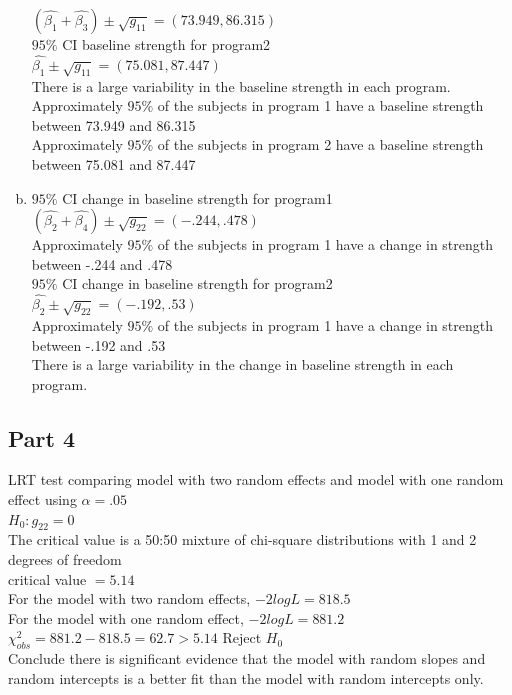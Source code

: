 \documentclass{article}
\begin{document}
\begin{flushleft}
\begin{enumerate}[(a)]
$(\hat{\beta_1}+ \hat{\beta_3})\pm \sqrt{g_{11}} =(73.949,86.315)$\\
$95\%$ CI baseline strength for program2\\ $\hat{\beta_1}\pm \sqrt{g_{11}} =(75.081,87.447)$\\
There is a large variability in the baseline strength in each program.\\
Approximately $95\%$ of the subjects in program 1 have a baseline strength between 73.949 and 86.315\\
Approximately $95\%$ of the subjects in program 2 have a baseline strength between 75.081 and 87.447\\
\item
$95\%$ CI change in baseline strength for program1\\ $(\hat{\beta_2}+\hat{\beta_4})\pm \sqrt{g_{22}}=(-.244,.478)$\\
Approximately $95\%$ of the subjects in program 1 have a change in strength between -.244 and .478\\
$95\%$ CI change in baseline strength for program2\\
$\hat{\beta_2}\pm \sqrt{g_{22}}=(-.192,.53)$\\
Approximately $95\%$ of the subjects in program 1 have a change in strength between -.192 and .53\\
There is a large variability in the change in baseline strength in each program.\\
\end{enumerate}
\pagebreak
\subsection*{Part 4}
LRT test comparing model with two random effects and model with one random effect using $\alpha=.05$\\
$H_0: g_{22}=0$\\
The critical value is a 50:50 mixture of chi-square distributions with 1 and 2 degrees of freedom\\
critical value $=5.14$\\
For the model with two random effects, $-2 log L = 818.5$\\
For the model with one random effect, $-2 log L=881.2$\\
$\chi^2_{obs}=881.2-818.5=62.7>5.14$ Reject $H_0$\\
Conclude there is significant evidence that the model with random slopes and random intercepts is a better
fit than the model with random intercepts only.

\end{flushleft}
\end{document}
